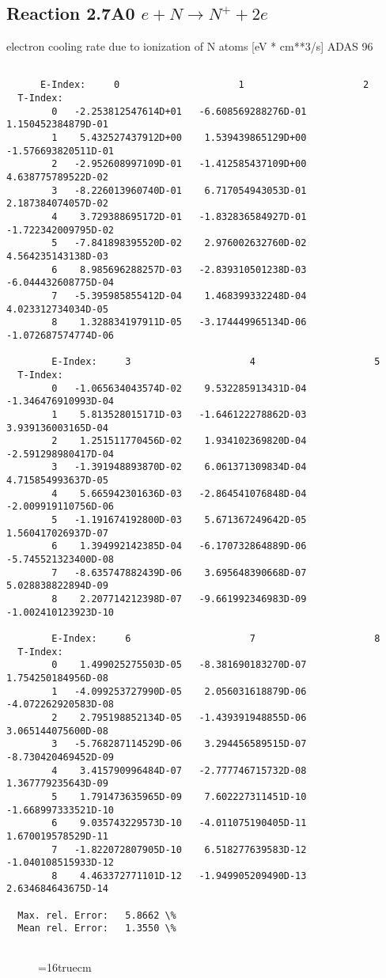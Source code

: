 \documentclass[12pt,dvipdfmx]{article}
\begin{document}
\subsection{
  Reaction 2.7A0  $e + N  \rightarrow N^+   + 2e $
}
electron cooling rate due to ionization of N atoms [eV * cm**3/s]
ADAS 96

\begin{small}\begin{verbatim}

      E-Index:     0                     1                     2
  T-Index:
        0   -2.253812547614D+01   -6.608569288276D-01    1.150452384879D-01
        1    5.432527437912D+00    1.539439865129D+00   -1.576693820511D-01
        2   -2.952608997109D-01   -1.412585437109D+00    4.638775789522D-02
        3   -8.226013960740D-01    6.717054943053D-01    2.187384074057D-02
        4    3.729388695172D-01   -1.832836584927D-01   -1.722342009795D-02
        5   -7.841898395520D-02    2.976002632760D-02    4.564235143138D-03
        6    8.985696288257D-03   -2.839310501238D-03   -6.044432608775D-04
        7   -5.395985855412D-04    1.468399332248D-04    4.023312734034D-05
        8    1.328834197911D-05   -3.174449965134D-06   -1.072687574774D-06

        E-Index:     3                     4                     5
  T-Index:
        0   -1.065634043574D-02    9.532285913431D-04   -1.346476910993D-04
        1    5.813528015171D-03   -1.646122278862D-03    3.939136003165D-04
        2    1.251511770456D-02    1.934102369820D-04   -2.591298980417D-04
        3   -1.391948893870D-02    6.061371309834D-04    4.715854993637D-05
        4    5.665942301636D-03   -2.864541076848D-04   -2.009919110756D-06
        5   -1.191674192800D-03    5.671367249642D-05    1.560417026937D-07
        6    1.394992142385D-04   -6.170732864889D-06   -5.745521323400D-08
        7   -8.635747882439D-06    3.695648390668D-07    5.028838822894D-09
        8    2.207714212398D-07   -9.661992346983D-09   -1.002410123923D-10

        E-Index:     6                     7                     8
  T-Index:
        0    1.499025275503D-05   -8.381690183270D-07    1.754250184956D-08
        1   -4.099253727990D-05    2.056031618879D-06   -4.072262920583D-08
        2    2.795198852134D-05   -1.439391948855D-06    3.065144075600D-08
        3   -5.768287114529D-06    3.294456589515D-07   -8.730420469452D-09
        4    3.415790996484D-07   -2.777746715732D-08    1.367779235643D-09
        5    1.791473635965D-09    7.602227311451D-10   -1.668997333521D-10
        6    9.035743229573D-10   -4.011075190405D-11    1.670019578529D-11
        7   -1.822072807905D-10    6.518277639583D-12   -1.040108515933D-12
        8    4.463372771101D-12   -1.949905209490D-13    2.634684643675D-14

  Max. rel. Error:   5.8662 \%
  Mean rel. Error:   1.3550 \%


\end{verbatim}\end{small}
\begin{figure} \label{2.7il}
\epsfxsize=16truecm 
\end{figure}
\newpage
\end{document}
